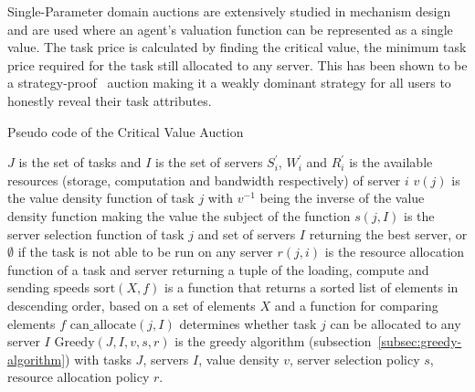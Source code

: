 Single-Parameter domain auctions are extensively studied in mechanism design~\cite{nisan2007algorithmic_228} and are
used where an agent's valuation function can be represented as a single value. The task price is calculated by finding
the critical value, the minimum task price required for the task still allocated to any server. This has
been shown to be a strategy-proof~\cite{nisan2007algorithmic_229_230} auction making it a weakly dominant strategy for
all users to honestly reveal their task attributes.

\begin{algorithm}
    \caption{Pseudo code of the Critical Value Auction}
    \label{alg:critical-value-auction}
    \begin{algorithmic}
        \REQUIRE $J$ is the set of tasks and $I$ is the set of servers
        \REQUIRE $S^{'}_i$, $W^{'}_i$ and $R^{'}_i$ is the available resources
            (storage, computation and bandwidth respectively) of server $i$
        \REQUIRE $v(j)$ is the value density function of task $j$ with $v^{-1}$ being the inverse of the value density
            function making the value the subject of the function
        \REQUIRE $s(j, I)$ is the server selection function of task $j$ and set of servers $I$ returning the best
            server, or $\emptyset$ if the task is not able to be run on any server
        \REQUIRE $r(j, i)$ is the resource allocation function of a task and server returning a tuple of the
            loading, compute and sending speeds
        \REQUIRE $\text{sort}(X, f)$ is a function that returns a sorted list of elements in descending order, based
            on a set of elements $X$ and a function for comparing elements $f$
        \REQUIRE $\text{can\_allocate}(j, I)$ determines whether task $j$ can be allocated to any server $I$
        \REQUIRE $\text{Greedy}(J, I, v, s, r)$ is the greedy algorithm (subsection~\ref{subsec:greedy-algorithm}) with
            tasks $J$, servers $I$, value density $v$, server selection policy $s$, resource allocation policy $r$.

                    \ENDIF
                    \ENDIF
                \ENDIF
            \ENDFOR
        \ENDFOR
    \end{algorithmic}
\end{algorithm}

